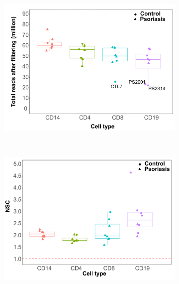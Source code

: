 \begin{figure}[htbp]
\centering
\begin{subfigure}{0.50\textwidth}
\centering
\includegraphics[width=\textwidth]{./Results2/pdfs/ChIPm_PS_CTL_final_filtered_reads_boxplot}
\caption{}
\end{subfigure}%
~
\begin{subfigure}{0.50\textwidth}
\centering
\includegraphics[width=\textwidth]{./Results2/pdfs/ChIPm_PS_CTL_NSC_boxplot}
\caption{}
\end{subfigure}
~
\begin{subfigure}{0.50\textwidth}
\centering

\end{subfigure}
\end{figure}
